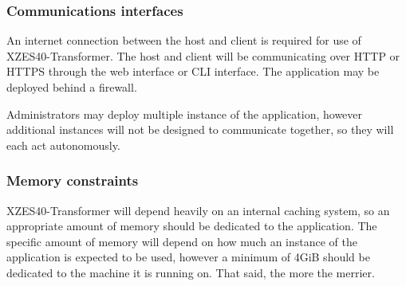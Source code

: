 

\subsubsection{Communications interfaces}

An internet connection between the host and client is required for use of XZES40-Transformer.
The host and client will be communicating over HTTP or HTTPS through the web interface or CLI interface.
The application may be deployed behind a firewall.

Administrators may deploy multiple instance of the application, however additional instances will not be designed to communicate together, so they will each act autonomously.


\subsubsection{Memory constraints}

XZES40-Transformer will depend heavily on an internal caching system, so an appropriate amount of memory should be dedicated to the application.
The specific amount of memory will depend on how much an instance of the application is expected to be used, however
a minimum of 4GiB should be dedicated to the machine it is running on.
That said, the more the merrier.

